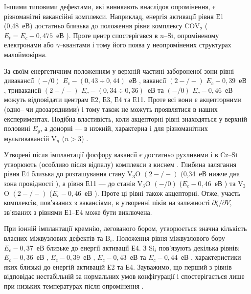 Іншими типовими дефектами, які виникають внаслідок опромінення, є різноманітні
вакансійні комплекси.
Наприклад, енергія активації рівня Е1 (0,48~еВ) достатньо близька до положення рівня
комплексу COV$_2$  ($E_t=E_c-0,475$~еВ \cite{Lugakov}).
Проте центр спостерігався в $n$--Si, опроміненому електронами або $\gamma$--квантами \cite{Lugakov} і тому його поява у неопромінених структурах малоймовірна.

За своїм енергетичним положенням у верхній частині
забороненої зони рівні дивакансії $(-/0)$ $E_c-(0,43\div0,44)$~еВ \cite{V2:JAP2014,V2:PRB2002},
вакансії $(2-/-)$ $E_c-0,39$~еВ \cite{MSER55},
тривакансії $(2-/-)$ $E_c-(0,34\div0,36)$~еВ та $(-/0)$ $E_c-0,46$~еВ \cite{V3:PRB2012,V3:Markevich}
можуть відповідати центрам Е2, Е3, Е4 та Е11.
Проте всі вони є акцепторними (одно-- чи двозарядними) і тому також не можуть проявлятися
в наших експериментах.
Подібна властивість, коли акцепторні рівні знаходяться у верхній половині $E_g$,
а донорні --- в нижній, характерна і для різноманітних мультивакансій V$_n$ ($n>3$) \cite{Si:multiV}.

Утворені після імплантації фосфору вакансії є достатньо рухливими і в Cz--Si
утворюють (особливо після відпалу) комплекси з киснем \cite{V2toV2O}.
Глибина залягання рівня Е4 близька до розташування стану V$_3$O $(2-/-)$ (0,34~еВ нижче дна зона провідності \cite{V3:Markevich}),
а рівня Е11 --- до станів V$_3$O $(-/0)$ ($E_c-0,46$~еВ \cite{V3:Markevich})
та V$_2$O $(2-/-)$ ($E_c-0,46$~еВ \cite{V2:JAP2014}).
Проте ці рівні також акцепторні.
Отже, участь комплексів, пов'язаних з вакансіями, в утворенні
піків на залежності $\partial \zeta/ \partial V $, зв'язаних з рівнями Е1--Е4 може бути виключена.

При іонній імплантації кремнію, легованого бором,
утворюється значна кількість власних міжвузлових дефектів та B$_i$.
Положення рівня міжвузлового бору $E_c-0,37$~еВ \cite{Bi:Harris} близьке до  енергії активації Е4.
З Si$_i$ пов'язують декілька рівнів: $E_c-0,36$~еВ \cite{MSER55},
$E_c-0,39$~еВ \cite{MSER55,Si:Sii}, $E_c-0,43$~еВ \cite{Si:Sii} та
$E_c-0,44$~еВ \cite{VI:Luc}, характеристики яких близькі до енергій активацій Е2 та Е4.
Зауважимо, що перший з рівнів відповідає нестабільній за нормальних умов конфігурації і спостерігається лише при низьких температурах після опромінення \cite{MSER55}.

